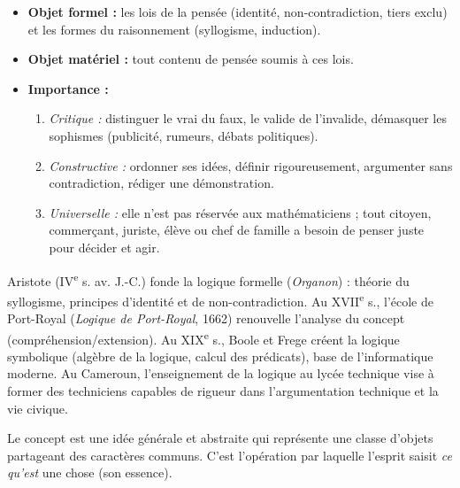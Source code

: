 \documentclass[11pt]{article}
\newcommand{\cle}[1]{{\popxbold\color{popdark}#1}}
\newcounter{popsec}
\newcounter{popsub}
\newcommand{\courssub}[1]{%
  \stepcounter{popsub}%
  \par\vspace{9pt}\noindent{\popxbold\fontsize{11.5}{13}\selectfont\color{popink}{\color{poporange}\thepopsec.\thepopsub}\hspace{6pt}#1}\par\nopagebreak\vspace{4pt}
}
\begin{document}
\begin{aretenir}
\begin{itemize}
\item \textbf{Objet formel :} les lois de la pensée (identité, non-contradiction, tiers exclu) et les formes du raisonnement (syllogisme, induction).
\item \textbf{Objet matériel :} tout contenu de pensée soumis à ces lois.
\item \textbf{Importance :}
\begin{enumerate}
\item \emph{Critique :} distinguer le vrai du faux, le valide de l'invalide, démasquer les sophismes (publicité, rumeurs, débats politiques).
\item \emph{Constructive :} ordonner ses idées, définir rigoureusement, argumenter sans contradiction, rédiger une démonstration.
\item \emph{Universelle :} elle n'est pas réservée aux mathématiciens ; tout citoyen, commerçant, juriste, élève ou chef de famille a besoin de penser juste pour décider et agir.
\end{enumerate}
\end{itemize}
\end{aretenir}

\begin{savaistu}
Aristote (IV\textsuperscript{e} s. av. J.-C.) fonde la logique formelle (\emph{Organon}) : théorie du syllogisme, principes d'identité et de non-contradiction. Au XVII\textsuperscript{e} s., l'école de Port-Royal (\emph{Logique de Port-Royal}, 1662) renouvelle l'analyse du concept (compréhension/extension). Au XIX\textsuperscript{e} s., Boole et Frege créent la logique symbolique (algèbre de la logique, calcul des prédicats), base de l'informatique moderne. Au Cameroun, l'enseignement de la logique au lycée technique vise à former des techniciens capables de rigueur dans l'argumentation technique et la vie civique.
\end{savaistu}

\courssub{Le concept}

\begin{definition}[Concept]
Le \cle{concept} est une idée générale et abstraite qui représente une classe d'objets partageant des caractères communs. C'est l'opération par laquelle l'esprit saisit \emph{ce qu'est} une chose (son essence).
\end{definition}
\end{document}
